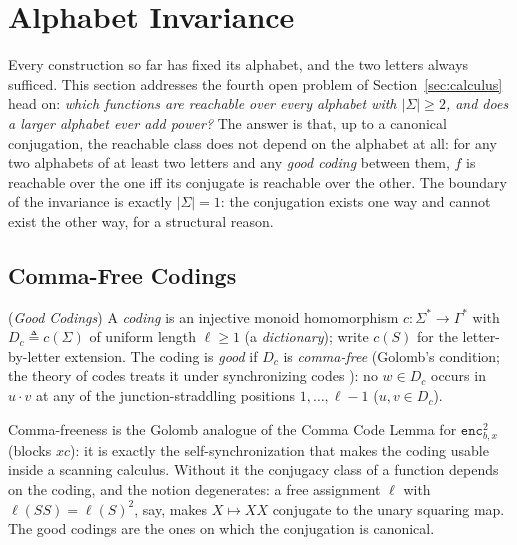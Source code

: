 
\section{Alphabet Invariance}
\label{sec:alphabet}

Every construction so far has fixed its alphabet, and the two letters always
sufficed. This section addresses the fourth open problem of
Section~\ref{sec:calculus} head on: \emph{which functions are reachable over
every alphabet with $|\Sigma| \ge 2$, and does a larger alphabet ever add
power?} The answer is that, up to a canonical conjugation, the reachable
class does not depend on the alphabet at all: for any two alphabets of at
least two letters and any \emph{good coding} between them, $f$ is reachable
over the one iff its conjugate is reachable over the other. The boundary of
the invariance is exactly $|\Sigma| = 1$: the conjugation exists one way and
cannot exist the other way, for a structural reason.

\subsection{Comma-Free Codings}

\begin{definition}
    (\emph{Good Codings})
    \label{def:code}
    A \emph{coding} is an injective monoid homomorphism $c : \Sigma^*
    \rightarrow \Gamma^*$ with $D_c \triangleq c(\Sigma)$ of uniform length
    $\ell \ge 1$ (a \emph{dictionary}); write $c(S)$ for the letter-by-letter
    extension. The coding is \emph{good} if $D_c$ is \emph{comma-free}
    (Golomb's condition; the theory of codes treats it under synchronizing
    codes \cite{berstel85,lothaire97}): no $w \in D_c$ occurs in $u \cdot v$
    at any of the junction-straddling positions $1, \dots, \ell-1$
    ($u, v \in D_c$).
\end{definition}

Comma-freeness is the Golomb analogue of the Comma Code Lemma for
$\mathtt{enc}^2_{b,x}$ (blocks $xc$): it is exactly the self-synchronization
that makes the coding usable inside a scanning calculus. Without it the
conjugacy class of a function depends on the coding, and the notion
degenerates: a free assignment $\ell$ with $\ell(SS) = \ell(S)^2$, say,
makes $X \mapsto XX$ conjugate to the unary squaring map. The good codings
are the ones on which the conjugation is canonical.

